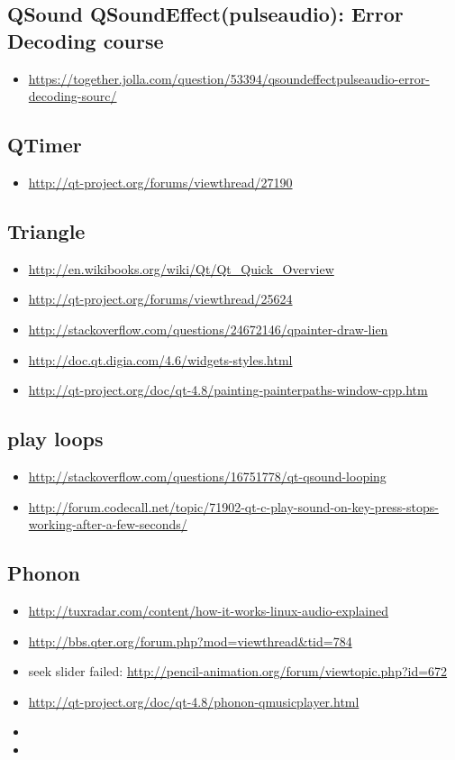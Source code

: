 \documentclass[9pt,b5paper]{article}
\begin{document}
\subsection{QSound QSoundEffect(pulseaudio): Error Decoding course}
\label{sec-16-17}
\begin{itemize}
\item \url{https://together.jolla.com/question/53394/qsoundeffectpulseaudio-error-decoding-sourc/}
\end{itemize}
\subsection{QTimer}
\label{sec-16-18}
\begin{itemize}
\item \url{http://qt-project.org/forums/viewthread/27190}
\end{itemize}
\subsection{Triangle}
\label{sec-16-19}
\begin{itemize}
\item \url{http://en.wikibooks.org/wiki/Qt/Qt_Quick_Overview}
\item \url{http://qt-project.org/forums/viewthread/25624}
\item \url{http://stackoverflow.com/questions/24672146/qpainter-draw-lien}
\item \url{http://doc.qt.digia.com/4.6/widgets-styles.html}
\item \url{http://qt-project.org/doc/qt-4.8/painting-painterpaths-window-cpp.htm}
\end{itemize}
\subsection{play loops}
\label{sec-16-20}
\begin{itemize}
\item \url{http://stackoverflow.com/questions/16751778/qt-qsound-looping}
\item \url{http://forum.codecall.net/topic/71902-qt-c-play-sound-on-key-press-stops-working-after-a-few-seconds/}
\end{itemize}
\subsection{Phonon}
\label{sec-16-21}
\begin{itemize}
\item \url{http://tuxradar.com/content/how-it-works-linux-audio-explained}
\item \url{http://bbs.qter.org/forum.php?mod=viewthread&tid=784}
\item seek slider failed: \url{http://pencil-animation.org/forum/viewtopic.php?id=672}
\item \url{http://qt-project.org/doc/qt-4.8/phonon-qmusicplayer.html}
\item 
\item 
\end{itemize}
\end{document}

